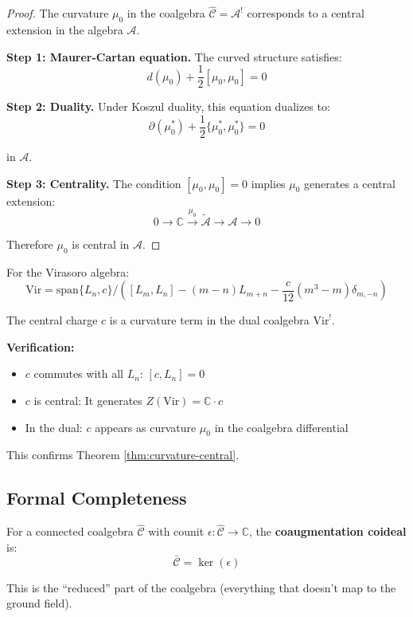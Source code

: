 \begin{proof}
The curvature $\mu_0$ in the coalgebra $\widehat{\mathcal{C}} = \mathcal{A}^!$ 
corresponds to a central extension in the algebra $\mathcal{A}$.

\textbf{Step 1: Maurer-Cartan equation.}
The curved structure satisfies:
$$d(\mu_0) + \frac{1}{2}[\mu_0, \mu_0] = 0$$
 
\textbf{Step 2: Duality.}
Under Koszul duality, this equation dualizes to:
$$\partial(\mu_0^*) + \frac{1}{2}\{\mu_0^*, \mu_0^*\} = 0$$

in $\mathcal{A}$.

\textbf{Step 3: Centrality.}
The condition $[\mu_0, \mu_0] = 0$ implies $\mu_0$ generates a central extension:
$$0 \to \mathbb{C} \xrightarrow{\mu_0} \tilde{\mathcal{A}} \to \mathcal{A} \to 0$$

Therefore $\mu_0$ is central in $\mathcal{A}$.
\end{proof}

\begin{example}\label{ex:virasoro-central-charge-curvature}
For the Virasoro algebra:
$$\text{Vir} = \text{span}\{L_n, c\} / ([L_m, L_n] - (m-n)L_{m+n} - \frac{c}{12}(m^3-m)\delta_{m,-n})$$

The central charge $c$ is a curvature term in the dual coalgebra $\text{Vir}^!$.

\textbf{Verification:}
\begin{itemize}
\item $c$ commutes with all $L_n$: $[c, L_n] = 0$
\item $c$ is central: It generates $Z(\text{Vir}) = \mathbb{C} \cdot c$
\item In the dual: $c$ appears as curvature $\mu_0$ in the coalgebra differential
\end{itemize}

This confirms Theorem \ref{thm:curvature-central}.
\end{example}

\subsection{Formal Completeness}

\begin{definition}\label{def:coaugmentation-coideal}
For a connected coalgebra $\widehat{\mathcal{C}}$ with counit $\epsilon: \widehat{\mathcal{C}} 
\to \mathbb{C}$, the \textbf{coaugmentation coideal} is:
$$\bar{\mathcal{C}} = \ker(\epsilon)$$

This is the ``reduced'' part of the coalgebra (everything that doesn't map to the 
ground field).
\end{definition}


